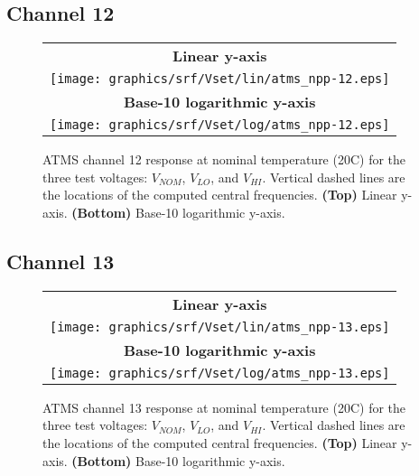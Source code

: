 \subsection{Channel 12}
\begin{figure}[H]
  \label{fig:Vset.ch12_response}
  \centering
  \begin{tabular}{c}
    \hspace{0.75cm}\sffamily\textbf{Linear y-axis} \\
    \texttt{[image: graphics/srf/Vset/lin/atms\_npp-12.eps]} \\
    \hspace{0.75cm}\sffamily\textbf{Base-10 logarithmic y-axis} \\
    \texttt{[image: graphics/srf/Vset/log/atms\_npp-12.eps]}
  \end{tabular}
  \caption{ATMS channel 12 response at nominal temperature (20\textdegree{}C) for the three test voltages: $V_{NOM}$, $V_{LO}$, and $V_{HI}$. Vertical dashed lines are the locations of the computed central frequencies. \textbf{(Top)} Linear y-axis. \textbf{(Bottom)} Base-10 logarithmic y-axis.}
\end{figure}

\subsection{Channel 13}
\begin{figure}[H]
  \label{fig:Vset.ch13_response}
  \centering
  \begin{tabular}{c}
    \hspace{0.75cm}\sffamily\textbf{Linear y-axis} \\
    \texttt{[image: graphics/srf/Vset/lin/atms\_npp-13.eps]} \\
    \hspace{0.75cm}\sffamily\textbf{Base-10 logarithmic y-axis} \\
    \texttt{[image: graphics/srf/Vset/log/atms\_npp-13.eps]}
  \end{tabular}
  \caption{ATMS channel 13 response at nominal temperature (20\textdegree{}C) for the three test voltages: $V_{NOM}$, $V_{LO}$, and $V_{HI}$. Vertical dashed lines are the locations of the computed central frequencies. \textbf{(Top)} Linear y-axis. \textbf{(Bottom)} Base-10 logarithmic y-axis.}
\end{figure}

